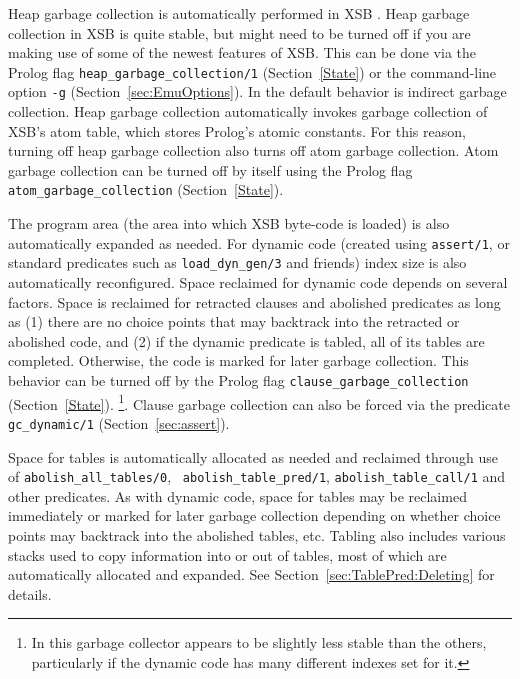 Heap garbage collection is automatically performed in XSB
\cite{CaSC01,CATmem@ISMM-98}.  Heap garbage collection in XSB is quite
stable, but might need to be turned off if you are making use of some
of the newest features of XSB.  This can be done via the Prolog flag
{\tt heap\_garbage\_collection/1} (Section~\ref{State}) or the
command-line option {\tt -g} (Section~\ref{sec:EmuOptions}).  In
\version{} the default behavior is indirect garbage collection.  Heap
garbage collection automatically invokes garbage collection of XSB's
atom table, which stores Prolog's atomic constants.  For this reason,
turning off heap garbage collection also turns off atom garbage
collection.  Atom garbage collection can be turned off by itself using
the Prolog flag {\tt atom\_garbage\_collection} (Section~\ref{State}).

The program area (the area into which XSB byte-code is loaded) is also
automatically expanded as needed.  For dynamic code (created using
{\tt assert/1}, or standard predicates such as {\tt load\_dyn\_gen/3}
and friends) index size is also automatically reconfigured.  Space
reclaimed for dynamic code depends on several factors.
Space is reclaimed for retracted clauses and abolished predicates as
long as (1) there are no choice points that may backtrack into the
retracted or abolished code, and (2) if the dynamic predicate is
tabled, all of its tables are completed.  Otherwise, the code is
marked for later garbage collection.  This behavior can be turned off
by the Prolog flag {\tt clause\_garbage\_collection}
(Section~\ref{State}). \footnote{In \version{} this garbage collector
  appears to be slightly less stable than the others, particularly if
  the dynamic code has many different indexes set for it.}.  Clause
garbage collection can also be forced via the predicate {\tt
  gc\_dynamic/1} (Section~\ref{sec:assert}).

Space for tables is automatically allocated as needed and reclaimed
through use of {\tt abolish\_all\_tables/0}, {\tt
  abolish\_table\_pred/1}, {\tt abolish\_table\_call/1} and other
predicates.  As with dynamic code, space for tables may be reclaimed
immediately or marked for later garbage collection depending on
whether choice points may backtrack into the abolished tables,
etc.  Tabling also includes various stacks used to copy information
into or out of tables, most of which are automatically allocated and
expanded.
See Section~\ref{sec:TablePred:Deleting} for details.



